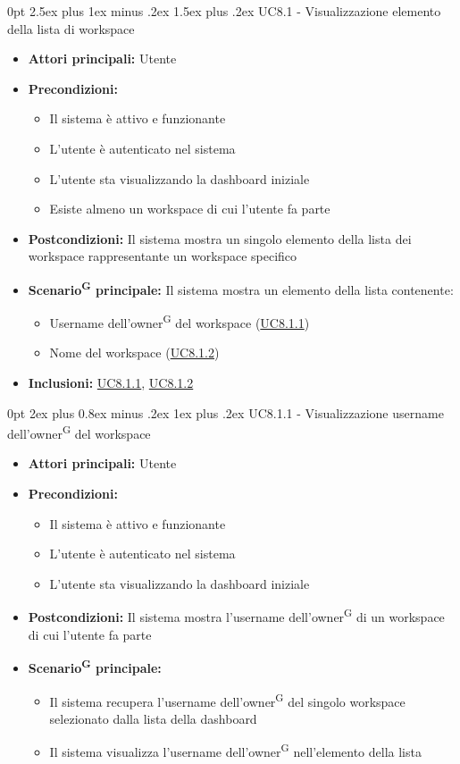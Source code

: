 \documentclass[a4paper, 11pt]{article}
\makeatletter
\renewcommand\paragraph{\@startsection{paragraph}{4}
  {0pt}
  {2.5ex plus 1ex minus .2ex}
  {1.5ex plus .2ex}
  {\normalfont\normalsize\bfseries\color{AccentDark}}}
\renewcommand\subparagraph{\@startsection{subparagraph}{5}
  {0pt}
  {2ex plus 0.8ex minus .2ex}
  {1ex plus .2ex}
  {\normalfont\normalsize\bfseries\color{AccentColor}}}
\makeatother
\begin{document}
\paragraph{UC8.1 - Visualizzazione elemento della lista di workspace}\label{UC8.1}
\begin{itemize}
	\item \textbf{Attori principali:} Utente
	\item \textbf{Precondizioni:} 
	\begin{itemize}
		\item Il sistema è attivo e funzionante
		\item L'utente è autenticato nel sistema
        \item L'utente sta visualizzando la dashboard iniziale
        \item Esiste almeno un workspace di cui l'utente fa parte
	\end{itemize}
    \item \textbf{Postcondizioni:} Il sistema mostra un singolo elemento della lista dei workspace rappresentante un workspace specifico
	\item \textbf{Scenario\textsuperscript{G} principale:} Il sistema mostra un elemento della lista contenente:
    \begin{itemize}
        \item Username dell'owner\textsuperscript{G} del workspace (\hyperref[UC8.1.1]{UC8.1.1})
        \item Nome del workspace (\hyperref[UC8.1.2]{UC8.1.2})
    \end{itemize}
    \item \textbf{Inclusioni:} \hyperref[UC8.1.1]{UC8.1.1}, \hyperref[UC8.1.2]{UC8.1.2}
\end{itemize}

\subparagraph{UC8.1.1 - Visualizzazione username dell'owner\textsuperscript{G} del workspace}\label{UC8.1.1}
\begin{itemize}
	\item \textbf{Attori principali:} Utente
	\item \textbf{Precondizioni:} 
	\begin{itemize}
		\item Il sistema è attivo e funzionante
		\item L'utente è autenticato nel sistema
        \item L'utente sta visualizzando la dashboard iniziale
	\end{itemize}
    \item \textbf{Postcondizioni:} Il sistema mostra l'username dell'owner\textsuperscript{G} di un workspace di cui l'utente fa parte
	\item \textbf{Scenario\textsuperscript{G} principale:}
    \begin{itemize}
        \item Il sistema recupera l'username dell'owner\textsuperscript{G} del singolo workspace selezionato dalla lista della dashboard
        \item Il sistema visualizza l'username dell'owner\textsuperscript{G} nell'elemento della lista
    \end{itemize}
\end{itemize}
\end{document}
